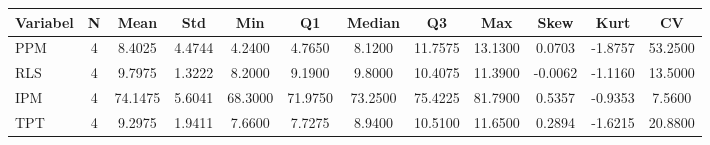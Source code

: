 \begin{adjustbox}{max width=\textwidth}
\small
\begin{tabular}{|p{2.5cm}|c|c|c|c|c|c|c|c|c|c|c|}
\hline
\textbf{Variabel} & \textbf{N} & \textbf{Mean} & \textbf{Std} & \textbf{Min} & \textbf{Q1} & \textbf{Median} & \textbf{Q3} & \textbf{Max} & \textbf{Skew} & \textbf{Kurt} & \textbf{CV} \\
\hline
PPM & 4 & 8.4025 & 4.4744 & 4.2400 & 4.7650 & 8.1200 & 11.7575 & 13.1300 & 0.0703 & -1.8757 & 53.2500 \\
RLS & 4 & 9.7975 & 1.3222 & 8.2000 & 9.1900 & 9.8000 & 10.4075 & 11.3900 & -0.0062 & -1.1160 & 13.5000 \\
IPM & 4 & 74.1475 & 5.6041 & 68.3000 & 71.9750 & 73.2500 & 75.4225 & 81.7900 & 0.5357 & -0.9353 & 7.5600 \\
TPT & 4 & 9.2975 & 1.9411 & 7.6600 & 7.7275 & 8.9400 & 10.5100 & 11.6500 & 0.2894 & -1.6215 & 20.8800 \\
\hline
\end{tabular}
\end{adjustbox}
